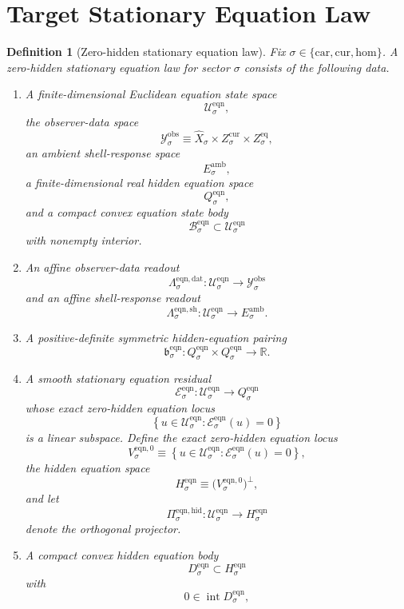 \documentclass[11pt]{article}
\newcommand{\Car}{\mathrm{car}}
\newcommand{\Cur}{\mathrm{cur}}
\newcommand{\Hom}{\mathrm{hom}}
\newcommand{\VisibleAffine}[1]{\widehat X_{#1}}
\newcommand{\DataSpace}[1]{\mathcal Y_{#1}^{\mathrm{obs}}}
\newcommand{\AmbientTarget}[1]{E_{#1}^{\mathrm{amb}}}
\newcommand{\EqnSpace}[1]{\mathcal U_{#1}^{\mathrm{eqn}}}
\newcommand{\EqnBody}[1]{\mathcal B_{#1}^{\mathrm{eqn}}}
\newcommand{\EqnData}[1]{\Lambda_{#1}^{\mathrm{eqn,dat}}}
\newcommand{\EqnShell}[1]{\Lambda_{#1}^{\mathrm{eqn,sh}}}
\newcommand{\EqnTarget}[1]{Q_{#1}^{\mathrm{eqn}}}
\newcommand{\EqnPair}[1]{\mathfrak b_{#1}^{\mathrm{eqn}}}
\newcommand{\EqnResidual}[1]{\mathcal E_{#1}^{\mathrm{eqn}}}
\newcommand{\EqnZero}[1]{V_{#1}^{\mathrm{eqn},0}}
\newcommand{\EqnHidden}[1]{H_{#1}^{\mathrm{eqn}}}
\newcommand{\EqnHiddenBody}[1]{D_{#1}^{\mathrm{eqn}}}
\newcommand{\EqnProj}[1]{\Pi_{#1}^{\mathrm{eqn,hid}}}
\newtheorem{definition}{Definition}
\begin{document}
\section{Target Stationary Equation Law}

\begin{definition}[Zero-hidden stationary equation law]
\label{def:equation}
Fix \(\sigma\in\{\Car,\Cur,\Hom\}\). A \emph{zero-hidden stationary equation law} for sector \(\sigma\) consists of the following data.
\begin{enumerate}
    \item A finite-dimensional Euclidean equation state space
    \[
    \EqnSpace{\sigma},
    \]
    the observer-data space
    \[
    \DataSpace{\sigma}
    \equiv
    \VisibleAffine{\sigma}\times Z_{\sigma}^{\mathrm{cur}}\times Z_{\sigma}^{\mathrm{eq}},
    \]
    an ambient shell-response space
    \[
    \AmbientTarget{\sigma},
    \]
    a finite-dimensional real hidden equation space
    \[
    \EqnTarget{\sigma},
    \]
    and a compact convex equation state body
    \[
    \EqnBody{\sigma}\subset\EqnSpace{\sigma}
    \]
    with nonempty interior.
    \item An affine observer-data readout
    \[
    \EqnData{\sigma}:\EqnSpace{\sigma}\to\DataSpace{\sigma}
    \]
    and an affine shell-response readout
    \[
    \EqnShell{\sigma}:\EqnSpace{\sigma}\to\AmbientTarget{\sigma}.
    \]
    \item A positive-definite symmetric hidden-equation pairing
    \[
    \EqnPair{\sigma}:
    \EqnTarget{\sigma}\times\EqnTarget{\sigma}\to\mathbb R.
    \]
    \item A smooth stationary equation residual
    \[
    \EqnResidual{\sigma}:\EqnSpace{\sigma}\to\EqnTarget{\sigma}
    \]
    whose exact zero-hidden equation locus
    \[
    \left\{
    u\in\EqnSpace{\sigma}:
    \EqnResidual{\sigma}(u)=0
    \right\}
    \]
    is a linear subspace. Define the exact zero-hidden equation locus
    \[
    \EqnZero{\sigma}
    \equiv
    \left\{
    u\in\EqnSpace{\sigma}:
    \EqnResidual{\sigma}(u)=0
    \right\},
    \]
    the hidden equation space
    \[
    \EqnHidden{\sigma}
    \equiv
    \bigl(\EqnZero{\sigma}\bigr)^{\perp},
    \]
    and let
    \[
    \EqnProj{\sigma}:\EqnSpace{\sigma}\to\EqnHidden{\sigma}
    \]
    denote the orthogonal projector.
    \item A compact convex hidden equation body
    \[
    \EqnHiddenBody{\sigma}\subset\EqnHidden{\sigma}
    \]
    with
    \[
    0\in\operatorname{int}\EqnHiddenBody{\sigma},
\]
\end{enumerate}
\end{definition}
\end{document}
